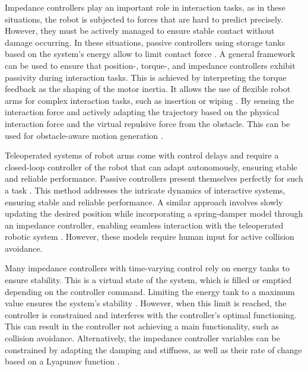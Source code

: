 \iflong
Impedance controllers play an important role in interaction tasks, as in these situations, the robot is subjected to forces that are hard to predict precisely. However, they must be actively managed to ensure stable contact without damage occurring. In these situations, passive controllers using storage tanks based on the system's energy allow to limit contact force \parencite{kishi2003passive}.
A general framework can be used to ensure that position-, torque-, and impedance controllers exhibit passivity during interaction tasks. This is achieved by interpreting the torque feedback as the shaping of the motor inertia. It allows the use of flexible robot arms for complex interaction tasks, such as insertion or wiping \parencite{albu2007unified}. 
By sensing the interaction force and actively adapting the trajectory based on the physical interaction force and the virtual repulsive force from the obstacle. This can be used for obstacle-aware motion generation \parencite{haddadin2010real}.
\fi

\iflong
Teleoperated systems of robot arms come with control delays and require a closed-loop controller of the robot that can adapt autonomously, ensuring stable and reliable performance. Passive controllers present themselves perfectly for such a task  \parencite{stramigioli2005sampled}. This method addresses the intricate dynamics of interactive systems, ensuring stable and reliable performance.
A similar approach involves slowly updating the desired position while incorporating a spring-damper model through an impedance controller, enabling seamless interaction with the teleoperated robotic system \parencite{lee2010passive}.
However, these models require human input for active collision avoidance.
\fi

Many impedance controllers with time-varying control rely on energy tanks to ensure stability. This is a virtual state of the system, which is filled or emptied depending on the controller command. Limiting the energy tank to a maximum value ensures the system's stability  \parencite{ferraguti2013tank}. However, when this limit is reached, the controller is constrained and interferes with the controller's optimal functioning. This can result in the controller not achieving a main functionality, such as collision avoidance.
Alternatively, the impedance controller variables can be constrained by adapting the damping and stiffness, as well as their rate of change based on a Lyapunov function \cite{kronander2016stability}.

